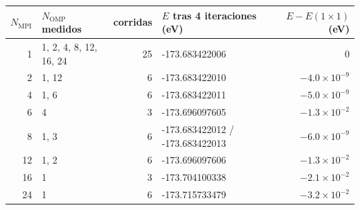 \begin{tabular}{r l r l r}
\toprule
$N_\mathrm{MPI}$ & $N_\mathrm{OMP}$ medidos & corridas & $E$ tras 4 iteraciones (eV) & $E - E(1\times1)$ (eV) \\
\midrule
1 & 1, 2, 4, 8, 12, 16, 24 & 25 & -173.683422006 & 0 \\
2 & 1, 12 & 6 & -173.683422010 & $-4.0\times10^{-9}$ \\
4 & 1, 6 & 6 & -173.683422011 & $-5.0\times10^{-9}$ \\
6 & 4 & 3 & -173.696097605 & $-1.3\times10^{-2}$ \\
8 & 1, 3 & 6 & -173.683422012 / -173.683422013 & $-6.0\times10^{-9}$ \\
12 & 1, 2 & 6 & -173.696097606 & $-1.3\times10^{-2}$ \\
16 & 1 & 3 & -173.704100338 & $-2.1\times10^{-2}$ \\
24 & 1 & 6 & -173.715733479 & $-3.2\times10^{-2}$ \\
\bottomrule
\end{tabular}
